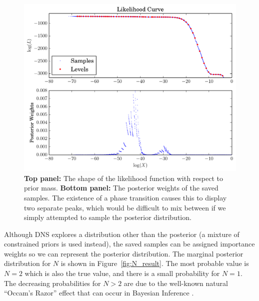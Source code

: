 \documentclass[letterpaper, 11pt]{article}
\begin{document}
\begin{figure}
\begin{center}
\includegraphics[scale=0.5]{sinewaves_likelihood.pdf}
\caption{{\bf Top panel: }
The shape of the likelihood function with respect to prior mass.
{\bf Bottom panel: }The posterior weights of the saved samples. The existence
of a phase transition causes this to display two separate peaks, which
would be difficult to mix between if we simply attempted to sample the posterior
distribution.
\label{fig:sinewaves_likelihood}}
\end{center}
\end{figure}

Although DNS explores a distribution other than the posterior (a mixture of
constrained priors is used instead), the saved samples can be assigned
importance weights so we can represent the posterior distribution. The
marginal posterior distribution for $N$ is shown in Figure~\ref{fig:N_result}.
The most probable value is $N=2$ which is also the true value, and there is
a small probability for $N=1$. The decreasing probabilities for $N > 2$ are
due to the well-known natural ``Occam's Razor'' effect that can occur in
Bayesian Inference \citep[e.g.][Chapter 28]{mackay}.
\end{document}

